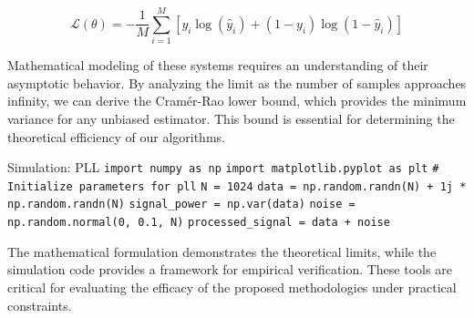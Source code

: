 \begin{equation}
    \mathcal{L}(\theta) = -\frac{1}{M} \sum_{i=1}^{M} \left[ y_i \log(\hat{y}_i) + (1-y_i)\log(1-\hat{y}_i) \right]
\end{equation}

Mathematical modeling of these systems requires an understanding of their asymptotic behavior. By analyzing the limit as the number of samples approaches infinity, we can derive the Cramér-Rao lower bound, which provides the minimum variance for any unbiased estimator. This bound is essential for determining the theoretical efficiency of our algorithms.

\begin{pythonbox}{Simulation: PLL}
\texttt{import numpy as np}
\texttt{import matplotlib.pyplot as plt}
\texttt{}
\texttt{\# Initialize parameters for pll}
\texttt{N = 1024}
\texttt{data = np.random.randn(N) + 1j * np.random.randn(N)}
\texttt{signal\_power = np.var(data)}
\texttt{noise = np.random.normal(0, 0.1, N)}
\texttt{processed\_signal = data + noise}
\end{pythonbox}

\vspace{0.5cm}
The mathematical formulation demonstrates the theoretical limits, while the simulation code provides a framework for empirical verification. These tools are critical for evaluating the efficacy of the proposed methodologies under practical constraints.

